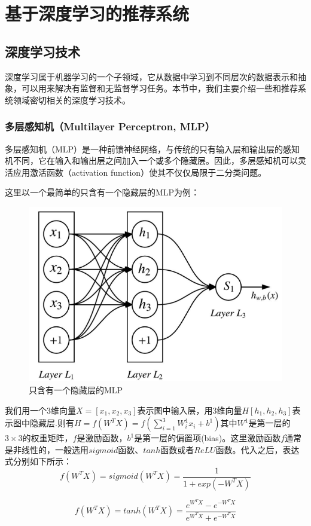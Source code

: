 \chapter{基于深度学习的推荐系统}
\section{深度学习技术}
深度学习属于机器学习的一个子领域，它从数据中学习到不同层次的数据表示和抽象，可以用来解决有监督和无监督学习任务\cite{DengY14DLMA}。本节中，我们主要介绍一些和推荐系统领域密切相关的深度学习技术。

\subsection{多层感知机（Multilayer Perceptron, MLP）}
多层感知机（MLP）是一种前馈神经网络，与传统的只有输入层和输出层的感知机不同，它在输入和输出层之间加入一个或多个隐藏层。因此，多层感知机可以灵活应用激活函数（activation function）使其不仅仅局限于二分类问题。

这里以一个最简单的只含有一个隐藏层的MLP为例\cite{abs-1801-07883DLS}：
\begin{figure}[h]
\centering
\includegraphics[width=0.5\linewidth]{images/MLP.png}
\caption{只含有一个隐藏层的MLP}
\label{fig:fig1}
\end{figure}
我们用一个$3$维向量$X=[x_1,x_2,x_3]$表示图中输入层，用$3$维向量$H[h_1,h_2,h_3]$表示图中隐藏层.则有$H = f(W^{T}X) = f(\sum\nolimits_{i=1}^{3}W^{1}_{i}x_{i} + b^{1})$其中$W^{1}$是第一层的$3 \times 3$的权重矩阵，$f$是激励函数，$b^{1}$是第一层的偏置项(bias)。这里激励函数$f$通常是非线性的，一般选用$sigmoid$函数、$tanh$函数或者$ReLU$函数。代入之后，表达式分别如下所示：
\begin{equation}
f(W^TX) = sigmoid(W^TX) = \frac{1}{1+exp(-W^TX)}
\end{equation}

\begin{equation}
f(W^TX) = tanh(W^TX) = \frac{e^{W^TX} - e^{-W^TX}}{e^{W^TX} + e^{-W^TX}}
\end{equation}

